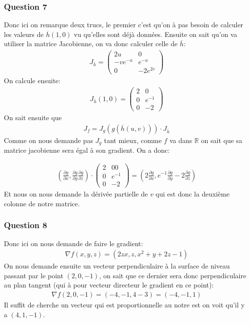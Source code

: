 \documentclass[a4paper]{article}
\begin{document}
\subsubsection{Question 7}
Donc ici on remarque deux trucs, le premier c'est qu'on à pas besoin de calculer les valeurs de $\overline{h}\left(1, 0\right)$ vu qu'elles sont déjà données. Ensuite on sait qu'on va utiliser la matrice Jacobienne, on va donc calculer celle de $\overline{h}$:
\begin{align*} 
    J_{\overline{h}} = \begin{pmatrix} 2u & 0 \\ -ve^{-u} & e^{-u} \\ 0 & -2e^{2v} \end{pmatrix} 
\end{align*}
On calcule ensuite:
\begin{align*} 
    J_{\overline{h}}\left(1, 0\right) =  \begin{pmatrix} 2 & 0 \\ 0 &e^{-1} \\ 0 & -2 \end{pmatrix} 
\end{align*}
On sait ensuite que 
\begin{align*} 
    J_{f} =  J_g\left(g\left(\overline{h}\left(u, v\right)\right)\right) \cdot  J_{\overline{h}}
\end{align*}
Comme on nous demande pas $J_g$ tant mieux, comme $f$ va dans $\mathbb{R}$ on sait que sa matrice jacobienne sera égal à son gradient. On a donc:

\begin{align*} 
    \left(\frac{\partial g}{\partial x} , \frac{\partial g}{\partial y} \frac{\partial g}{\partial z}  \right)\cdot  \begin{pmatrix} 2 & 0 0\\ 0 &  e^{-1}\\ 0 & -2 \end{pmatrix} = \left( 2 \frac{\partial g}{\partial x} , e^{-1} \frac{\partial g}{\partial y} -2 \frac{\partial g}{\partial z} \right)
\end{align*}
Et nous on nous demande la dérivée partielle de $v$ qui est donc la deuxième colonne de notre matrice.



\subsubsection{Question 8}
Donc ici on nous demande de faire le gradient:
\begin{align*} 
    \nabla f \left(x, y, z\right) =  \left(2zx, z, x^2 + y + 2z - 1\right)
\end{align*}
On nous demande ensuite un vecteur perpendiculaire à la surface de niveau passant par  le point $\left(2, 0, -1\right)$, on sait que ce dernier sera donc perpendiculaire au plan tangent (qui à pour vecteur directeur le gradient en ce point):
\begin{align*} 
    \nabla f \left(2, 0, -1\right) =  \left(-4, -1, 4 -3\right) = \left(-4, -1, 1\right)
\end{align*}
Il suffit de cherche un vecteur qui est proportionnelle au notre est on voit qu'il y a $\left(4, 1, -1\right)$.
\end{document}

